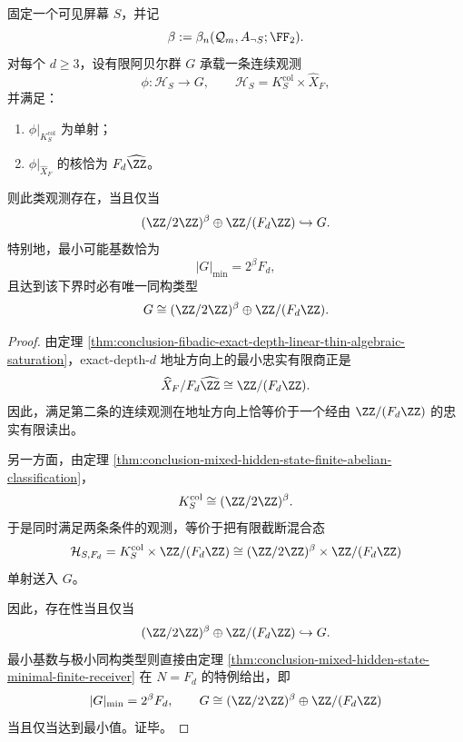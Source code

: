\begin{theorem}[混合隐藏态的精确深度最小受体刚性]\label{thm:conclusion-mixed-hidden-state-exact-depth-minimal-receiver}
固定一个可见屏幕 \(S\)，并记
\[
\beta:=\beta_n(\mathcal Q_m,A_{\neg S};\FF_2).
\]
对每个 \(d\ge 3\)，设有限阿贝尔群 \(G\) 承载一条连续观测
\[
\phi:\mathcal H_S\to G,
\qquad
\mathcal H_S=K_S^{\mathrm{col}}\times \widehat X_F,
\]
并满足：
\begin{enumerate}
  \item \(\phi|_{K_S^{\mathrm{col}}}\) 为单射；
  \item \(\phi|_{\widehat X_F}\) 的核恰为 \(F_d\widehat{\ZZ}\)。
\end{enumerate}
则此类观测存在，当且仅当
\[
(\ZZ/2\ZZ)^\beta\oplus \ZZ/(F_d\ZZ)\hookrightarrow G.
\]
特别地，最小可能基数恰为
\[
|G|_{\min}=2^\beta F_d,
\]
且达到该下界时必有唯一同构类型
\[
G\cong (\ZZ/2\ZZ)^\beta\oplus \ZZ/(F_d\ZZ).
\]
\end{theorem}
\begin{proof}
由定理 \ref{thm:conclusion-fibadic-exact-depth-linear-thin-algebraic-saturation}，exact-depth-\(d\) 地址方向上的最小忠实有限商正是
\[
\widehat X_F/F_d\widehat{\ZZ}\cong \ZZ/(F_d\ZZ).
\]
因此，满足第二条的连续观测在地址方向上恰等价于一个经由 \(\ZZ/(F_d\ZZ)\) 的忠实有限读出。

另一方面，由定理 \ref{thm:conclusion-mixed-hidden-state-finite-abelian-classification}，
\[
K_S^{\mathrm{col}}\cong (\ZZ/2\ZZ)^\beta.
\]
于是同时满足两条条件的观测，等价于把有限截断混合态
\[
\mathcal H_{S,F_d}
=
K_S^{\mathrm{col}}\times \ZZ/(F_d\ZZ)
\cong
(\ZZ/2\ZZ)^\beta\times \ZZ/(F_d\ZZ)
\]
单射送入 \(G\)。

因此，存在性当且仅当
\[
(\ZZ/2\ZZ)^\beta\oplus \ZZ/(F_d\ZZ)\hookrightarrow G.
\]
最小基数与极小同构类型则直接由定理
\ref{thm:conclusion-mixed-hidden-state-minimal-finite-receiver}
在 \(N=F_d\) 的特例给出，即
\[
|G|_{\min}=2^\beta F_d,
\qquad
G\cong (\ZZ/2\ZZ)^\beta\oplus \ZZ/(F_d\ZZ)
\]
当且仅当达到最小值。证毕。
\end{proof}

